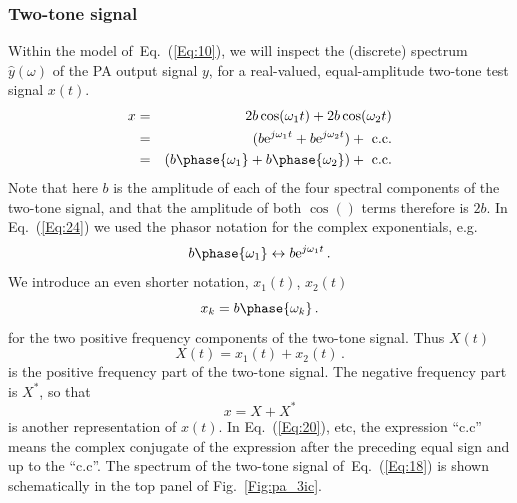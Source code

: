 \documentclass[11pt,oneside,a4paper]{scrartcl}
\newcommand{\EQ}[1]{\begin{equation}\label{Eq:#1}}
\newcommand{\EE}{\end{equation}}
\newcommand{\Eq}[1]{Eq.~(\ref{Eq:#1})}
\newcommand{\Fig}[1]{Fig.~\ref{Fig:#1}}
\newcommand{\cc}[1]{\ensuremath{{#1}^*}}
\newcommand{ \Exp }[1] {\ensuremath {\mathrm e ^ {#1}}}
\begin{document}
\subsubsection*{Two-tone signal}
Within the model of~\Eq{10}, we will inspect the (discrete) spectrum $\hat y(\omega)$ of the PA output signal $y$, for a real-valued, equal-amplitude two-tone test signal $x(t)$.
\begin{eqnarray}
	x &=& 2 b\cos(\omega_1t) + 2b\cos(\omega_2 t)
											\label{Eq:18} \\
	  &=& (b\Exp{j \omega_1 t} + b\Exp { j \omega_2 t }) + \mbox{ c.c.}
											\label{Eq:20} \\
	  &=& (b\phase{\omega_1} + b\phase{\omega_2}) + \mbox{ c.c.} \label{Eq:24}
\end{eqnarray}
%
Note that here $b$ is the amplitude of each of the four spectral components of the two-tone signal, and that the amplitude of both $\cos()$ terms therefore is $2b$.
In \Eq{24} we used the phasor notation for the complex exponentials, e.g.
\EQ{30}
	b\phase{\omega_1} \leftrightarrow b \Exp{j \omega_1 t} \,.
\EE
%
We introduce an even shorter notation, $x_1(t)$, $x_2(t)$ 
\EQ{32}
	x_k = b\phase{\omega_k} \,.
\EE
for the two positive frequency components of the two-tone signal.  Thus $X(t)$
\EQ{32}
	X(t) = x_1(t) + x_2(t) \,.
\EE
is the positive frequency part of the two-tone signal. The negative frequency part 
is $\cc X$, so that 
\EQ{33}
	x = X + \cc X
\EE
is another representation of $x(t)$. 
%
In \Eq{20}, etc, the expression ``c.c'' means the complex conjugate of the expression after the preceding equal sign and up to the ``c.c''.
%
The spectrum of the two-tone signal of~\Eq{18} is shown schematically in the top panel of \Fig{pa_3ic}.
\end{document}
